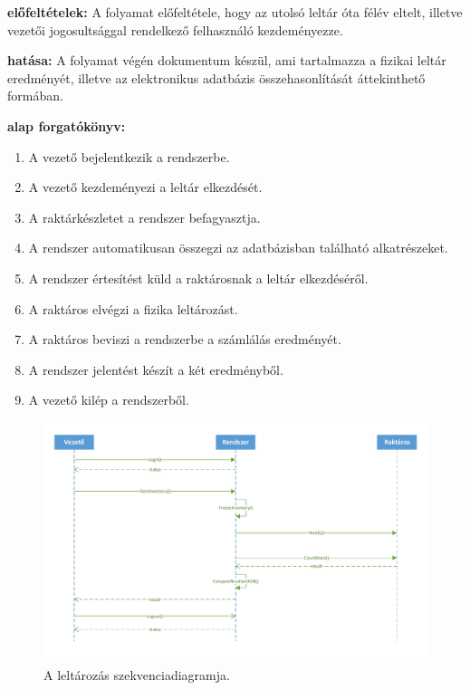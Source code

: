 \documentclass[12pt]{article}\usepackage[left=20mm,right=20mm,top=14mm,bottom=20mm]{geometry}
\begin{document}
\noindent\textbf{előfeltételek: } A folyamat előfeltétele, hogy az utolsó leltár óta félév eltelt, illetve vezetői jogosultsággal rendelkező felhasználó kezdeményezze.
\vspace{4mm}

\noindent\textbf{hatása: }
A folyamat végén dokumentum készül, ami tartalmazza a fizikai leltár eredményét, illetve az elektronikus adatbázis összehasonlítását áttekinthető formában.
\vspace{4mm}

\noindent\textbf{alap forgatókönyv: }
\begin{enumerate}
\item A vezető bejelentkezik a rendszerbe.
\item A vezető kezdeményezi a leltár elkezdését.
\item A raktárkészletet a rendszer befagyasztja.
\item A rendszer automatikusan összegzi az adatbázisban található alkatrészeket.
\item A rendszer értesítést küld a raktárosnak a leltár elkezdéséről.
\item A raktáros elvégzi a fizika leltározást.
\item A raktáros beviszi a rendszerbe a számlálás eredményét.
\item A rendszer jelentést készít a két eredményből.
\item A vezető kilép a rendszerből.
\end{enumerate}

\begin{figure}[!h]
    \centering
        \includegraphics[width=\textwidth]{kepek/leltarazas_SD.pdf}
        \caption{A leltározás szekvenciadiagramja.\label{fig:leltar}}
\end{figure}
\end{document}
